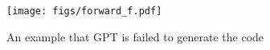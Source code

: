 \begin{figure}
    \centering
    \texttt{[image: figs/forward\_f.pdf]}
    \caption{An example that GPT is failed to generate the code
    }
    \label{fig:rejected1}
\end{figure}